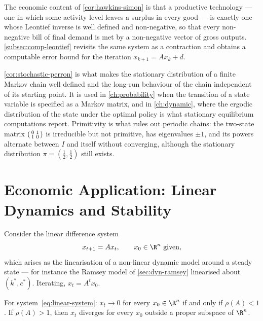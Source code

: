 The economic content of \autoref{cor:hawkins-simon} is that a productive
technology --- one in which some activity level leaves a surplus in every good
--- is exactly one whose Leontief inverse is well defined and non-negative, so
that every non-negative bill of final demand is met by a non-negative vector of
gross outputs. \autoref{subsec:comp-leontief} revisits the same system as a
contraction and obtains a computable error bound for the iteration
$x_{k+1}=Ax_k+d$.

\autoref{cor:stochastic-perron} is what makes the stationary distribution of a
finite Markov chain well defined and the long-run behaviour of the chain
independent of its starting point. It is used in \autoref{ch:probability} when
the transition of a state variable is specified as a Markov matrix, and in
\autoref{ch:dynamic}, where the ergodic distribution of the state under the
optimal policy is what stationary equilibrium computations report. Primitivity
is what rules out periodic chains: the two-state matrix
$\begin{psmallmatrix}0&1\\1&0\end{psmallmatrix}$ is irreducible but not
primitive, has eigenvalues $\pm1$, and its powers alternate between $I$ and
itself without converging, although the stationary distribution
$\pi=(\tfrac12,\tfrac12)$ still exists.

\section{Economic Application: Linear Dynamics and Stability}\label{sec:lin-dynamics}

Consider the linear difference system
\begin{equation}\label{eq:linear-system}
	x_{t+1}=Ax_t,\qquad x_0\in\R^n\text{ given},
\end{equation}
which arises as the linearisation of a non-linear dynamic model around a steady
state --- for instance the Ramsey model of \autoref{sec:dyn-ramsey} linearised
about $(k^\ast,c^\ast)$. Iterating, $x_t=A^tx_0$.

\begin{proposition}[Stability]\label{prop:linear-stability}
	For system~\eqref{eq:linear-system}: $x_t\to0$ for every $x_0\in\R^n$ if and
	only if $\rho(A)<1$. If $\rho(A)>1$, then $x_t$ diverges for every $x_0$ outside
	a proper subspace of $\R^n$.
\end{proposition}

